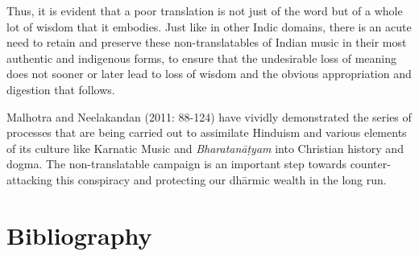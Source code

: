 Thus, it is evident that a poor translation is not just of the word but of a whole lot of wisdom that it embodies. Just like in other Indic domains, there is an acute need to retain and preserve these non-translatables of Indian music in their most authentic and indigenous forms, to ensure that the undesirable loss of meaning does not sooner or later lead to loss of wisdom and the obvious appropriation and digestion that follows. 

Malhotra and Neelakandan (2011: 88-124) have vividly demonstrated the series of processes that are being carried out to assimilate Hinduism and various elements of its culture like Karnatic Music and \textit{Bharatanāṭyam} into Christian history and dogma. The non-translatable campaign is an important step towards counter-attacking this conspiracy and protecting our dhārmic wealth in the long run.


\section*{Bibliography}

